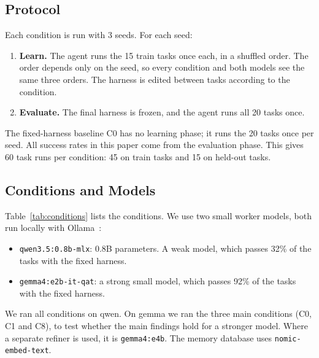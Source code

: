 \subsection{Protocol}
Each condition is run with 3 seeds. For each seed:
\begin{enumerate}
  \item \textbf{Learn.} The agent runs the 15 train tasks once each, in a shuffled order. The order
        depends only on the seed, so every condition and both models see the same three orders.
        The harness is edited between tasks according to the condition.
  \item \textbf{Evaluate.} The final harness is frozen, and the agent runs all 20 tasks once.
\end{enumerate}
The fixed-harness baseline C0 has no learning phase; it runs the 20 tasks once per seed. All
success rates in this paper come from the evaluation phase. This gives 60 task runs per condition:
45 on train tasks and 15 on held-out tasks.

\subsection{Conditions and Models}
Table~\ref{tab:conditions} lists the conditions. We use two small worker models, both run locally
with Ollama~\cite{ollama}:
\begin{itemize}
  \item \texttt{qwen3.5:0.8b-mlx}: 0.8B parameters. A weak model, which passes 32\% of the tasks
        with the fixed harness.
  \item \texttt{gemma4:e2b-it-qat}: a strong small model, which passes 92\% of the tasks with the
        fixed harness.
\end{itemize}
We ran all conditions on qwen. On gemma we ran the three main conditions (C0, C1 and C8), to test
whether the main findings hold for a stronger model. Where a separate refiner is used, it is
\texttt{gemma4:e4b}. The memory database uses \texttt{nomic-embed-text}.

